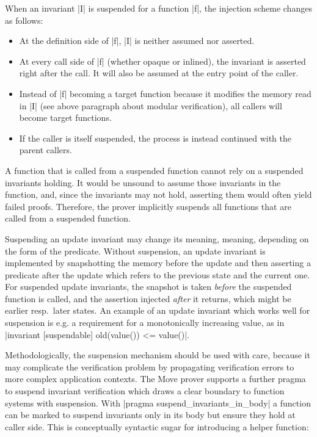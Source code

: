 When an invariant |I| is suspended for a function |f|, the injection scheme changes
as follows:

\begin{itemize}
\item At the definition side of |f|, |I| is neither assumed nor asserted.
\item At every call side of |f| (whether opaque or inlined), the invariant
  is asserted right after the call. It will also be assumed at the entry point
  of the caller.
\item Instead of |f| becoming a target function because it modifies the memory
  read in |I| (see above paragraph about modular verification), all callers will
  become target functions.
\item If the caller is itself suspended, the process is instead continued with
  the parent callers.
\end{itemize}

A function that is called from a suspended function cannot rely on a
suspended invariants holding.  It would be unsound to assume those invariants
in the function, and, since the invariants may not hold, asserting them would
often yield failed proofs.  Therefore, the prover implicitly suspends all
functions that are called from a suspended function.

Suspending an update invariant may change its meaning,
meaning, depending on the form of the predicate. Without suspension, an update
invariant is implemented by snapshotting the memory before the update and then
asserting a predicate after the update which refers to the previous state and
the current one. For suspended update invariants, the snapshot is taken
\emph{before} the suspended function is called, and the assertion injected
\emph{after} it returns, which might be earlier resp.~later states. An example
of an update invariant which works well for suspension is e.g. a requirement for
a monotonically increasing value, as in~%
|invariant [suspendable] old(value()) <= value()|.

Methodologically, the suspension mechanism should be used with care, because it
may complicate the verification problem by propagating verification errors to
more complex application contexts. The Move prover supports a further pragma to
suspend invariant verification which draws a clear boundary to function systems
with suspension. With |pragma suspend_invariants_in_body| a function can be
marked to suspend invariants only in its body but ensure they hold at caller
side. This is conceptually syntactic sugar for introducing a helper function:

